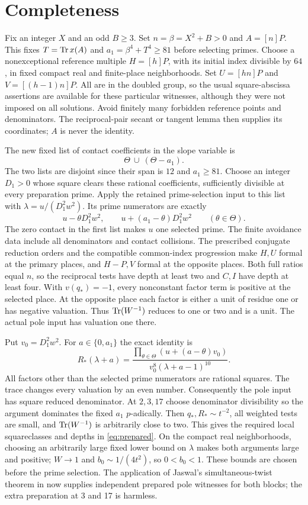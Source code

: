 \documentclass[11pt,a4paper]{article}
\begin{document}
\section{Completeness}\label{sec:complete}
Fix an integer $X$ and an odd $B\ge3$. Set $n=\beta=X^2+B>0$ and
$A=[n]P$. This fixes $T=\operatorname{Tr} x(A)$ and $a_1=\beta^4+T^4\ge81$
before selecting primes. Choose a nonexceptional reference multiple
$H=[h]P$, with its initial index divisible by $64$, in fixed compact
real and finite-place neighborhoods. Set $U=[hn]P$ and
$V=[(h-1)n]P$. All are in the doubled group, so the usual
square-abscissa assertions are available for these particular
witnesses, although they were not imposed on all solutions.
Avoid finitely many forbidden reference points and denominators.
The reciprocal-pair secant or tangent lemma then supplies its
coordinates; $A$ is never the identity.

The new fixed list of contact coefficients in the slope variable is
\[
                    \Theta\ \cup\ (\Theta-a_1).
\]
The two lists are disjoint since their span is $12$ and $a_1\ge81$.
Choose an integer $D_1>0$ whose square clears these rational
coefficients, sufficiently divisible at every preparation prime.
Apply the retained prime-selection input to this list with
$\lambda=u/(D_1^2w^2)$. Its prime numerators are exactly
\[
 u-\theta D_1^2w^2,\qquad
 u+(a_1-\theta)D_1^2w^2\qquad(\theta\in\Theta).
\]
The zero contact in the first list makes $u$ one selected prime.
The finite avoidance data include all denominators and contact
collisions. The prescribed conjugate reduction orders and the
compatible common-index progression make $H,U$ formal at the
primary places, and $H-P,V$ formal at the opposite places. Both
full ratios equal $n$, so the reciprocal tests have depth at least
two and $C,I$ have depth at least four. With $v(q_*)=-1$, every
nonconstant factor term is positive at the selected place. At the
opposite place each factor is either a unit of residue one or has
negative valuation. Thus $\operatorname{Tr}(W^{-1})$ reduces to one or two and is
a unit. The actual pole input has valuation one there.

Put $v_0=D_1^2w^2$. For $a\in\{0,a_1\}$ the exact identity is
\[
 R_*(\lambda+a)=
 \frac{\prod_{\theta\in\Theta}(u+(a-\theta)v_0)}
 {v_0^8(\lambda+a-1)^{10}}.
\]
All factors other than the selected prime numerators are rational
squares. The trace changes every valuation by an even number.
Consequently the pole input has square reduced denominator.
At $2,3,17$ choose denominator divisibility so the argument dominates
the fixed $a_1$ $p$-adically. Then $q_*,R_*\sim t^{-2}$, all weighted
tests are small, and $\operatorname{Tr}(W^{-1})$ is arbitrarily close to two.
This gives the required local squareclasses and depths in
\eqref{eq:prepared}. On the compact real neighborhoods, choosing an
arbitrarily large fixed lower bound on $\lambda$ makes both arguments
large and positive; $W\to1$ and $b_0\sim1/(4t^2)$, so
$0<b_0<1$. These bounds are chosen before the prime selection.
The application of Jaswal's simultaneous-twist theorem in \cite{Pole} now supplies independent prepared pole witnesses for both blocks; the extra preparation at 3 and 17 is harmless.
\end{document}
